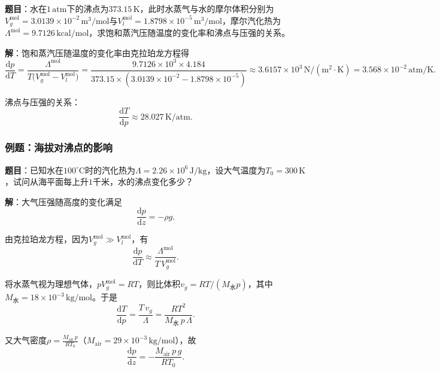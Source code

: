 \documentclass[UTF8]{ctexart}
\theoremstyle{definition}
\begin{document}
\textbf{题目}：水在$1\,\mathrm{atm}$下的沸点为$373.15\,\mathrm{K}$，此时水蒸气与水的摩尔体积分别为$V_g^{\mathrm{mol}}=3.0139\times10^{-2}\,\mathrm{m^3/mol}$与$V_l^{\mathrm{mol}}=1.8798\times10^{-5}\,\mathrm{m^3/mol}$，摩尔汽化热为$\Lambda^{\mathrm{mol}}=9.7126\,\mathrm{kcal/mol}$，求饱和蒸汽压随温度的变化率和沸点与压强的关系。

\textbf{解}：饱和蒸汽压随温度的变化率由克拉珀龙方程得
\begin{equation}
\frac{\mathrm{d}p}{\mathrm{d}T}
= \frac{\Lambda^{\mathrm{mol}}}{T\bigl(V_g^{\mathrm{mol}}-V_l^{\mathrm{mol}}\bigr)}
= \frac{9.7126\times10^3\times4.184}{373.15\times(3.0139\times10^{-2}-1.8798\times10^{-5})}
\approx 3.6157\times10^3\,\mathrm{N/(m^2\cdot K)}
= 3.568\times10^{-2}\,\mathrm{atm/K}.
\end{equation}

沸点与压强的关系：
\begin{equation}
\frac{\mathrm{d}T}{\mathrm{d}p} \approx 28.027\,\mathrm{K/atm}.
\end{equation}


\subsubsection*{例题：海拔对沸点的影响}

\textbf{题目}：已知水在$100^\circ\mathrm{C}$时的汽化热为$\Lambda=2.26\times10^6\,\mathrm{J/kg}$，设大气温度为$T_0=300\,\mathrm{K}$，试问从海平面每上升$1$千米，水的沸点变化多少？

\textbf{解}：大气压强随高度的变化满足
\begin{equation}
\frac{\mathrm{d}p}{\mathrm{d}z} = -\rho g.
\end{equation}

由克拉珀龙方程，因为$V_g^{\mathrm{mol}}\gg V_l^{\mathrm{mol}}$，有
\begin{equation}
\frac{\mathrm{d}p}{\mathrm{d}T} \approx \frac{\Lambda^{\mathrm{mol}}}{T\,V_g^{\mathrm{mol}}}.
\end{equation}

将水蒸气视为理想气体，$pV_g^{\mathrm{mol}}=RT$，则比体积$v_g=RT/(M_{\text{水}}p)$，其中$M_{\text{水}}=18\times10^{-3}\,\mathrm{kg/mol}$。于是
\begin{equation}
\frac{\mathrm{d}T}{\mathrm{d}p}
= \frac{T\,v_g}{\Lambda}
= \frac{R T^2}{M_{\text{水}}\,p\,\Lambda}.
\end{equation}

又大气密度$\displaystyle\rho=\frac{M_{\text{air}}\,p}{R T_0}$（$M_{\text{air}}=29\times10^{-3}\,\mathrm{kg/mol}$），故
\begin{equation}
\frac{\mathrm{d}p}{\mathrm{d}z} = -\frac{M_{\text{air}}\,p\,g}{R T_0}.
\end{equation}
\end{document}
